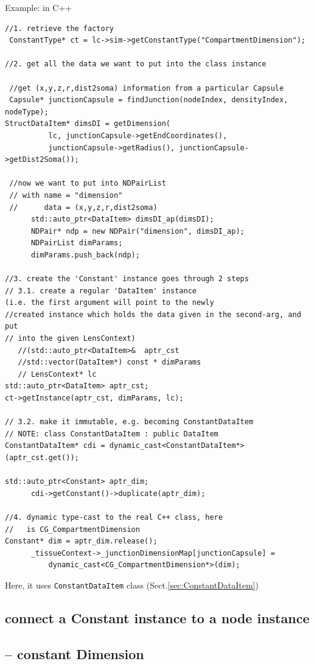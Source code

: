 Example: in C++
\begin{lstlisting}
//1. retrieve the factory
 ConstantType* ct = lc->sim->getConstantType("CompartmentDimension");
 
//2. get all the data we want to put into the class instance

 //get (x,y,z,r,dist2soma) information from a particular Capsule
 Capsule* junctionCapsule = findJunction(nodeIndex, densityIndex, nodeType);
StructDataItem* dimsDI = getDimension(
          lc, junctionCapsule->getEndCoordinates(),
          junctionCapsule->getRadius(), junctionCapsule->getDist2Soma());
          
 //now we want to put into NDPairList 
 // with name = "dimension"
 //      data = (x,y,z,r,dist2soma)          
      std::auto_ptr<DataItem> dimsDI_ap(dimsDI);
      NDPair* ndp = new NDPair("dimension", dimsDI_ap);
      NDPairList dimParams;
      dimParams.push_back(ndp);

//3. create the 'Constant' instance goes through 2 steps
// 3.1. create a regular 'DataItem' instance 
(i.e. the first argument will point to the newly
//created instance which holds the data given in the second-arg, and put
// into the given LensContext)
   //(std::auto_ptr<DataItem>&  aptr_cst
   //std::vector(DataItem*) const * dimParams
   // LensContext* lc   
std::auto_ptr<DataItem> aptr_cst;
ct->getInstance(aptr_cst, dimParams, lc);

// 3.2. make it immutable, e.g. becoming ConstantDataItem
// NOTE: class ConstantDataItem : public DataItem
ConstantDataItem* cdi = dynamic_cast<ConstantDataItem*>(aptr_cst.get());

std::auto_ptr<Constant> aptr_dim;
      cdi->getConstant()->duplicate(aptr_dim);
      
//4. dynamic type-cast to the real C++ class, here
//   is CG_CompartmentDimension      
Constant* dim = aptr_dim.release();
      _tissueContext->_junctionDimensionMap[junctionCapsule] =
          dynamic_cast<CG_CompartmentDimension*>(dim);
\end{lstlisting}

Here, it uses \verb!ConstantDataItem! class (Sect.\ref{sec:ConstantDataItem})


\subsection{connect a Constant instance to a node instance}

\subsection{-- constant Dimension}
\label{sec:connect-constant-Dimension}

